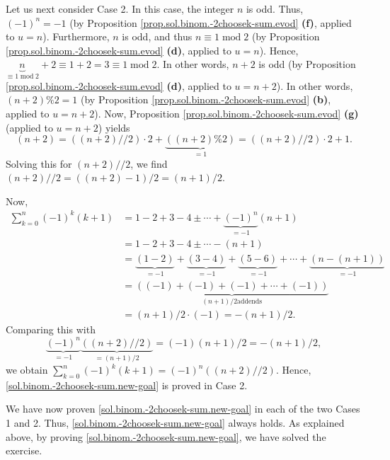 \documentclass[paper=a4, fontsize=12pt]{scrartcl}%
\let\sumnonlimits\sum
\renewcommand{\sum}{\sumnonlimits\limits}
\theoremstyle{plainsl}
\theoremstyle{definition}
\theoremstyle{remark}
\begin{document}
Let us next consider Case 2. In this case, the integer $n$ is odd. Thus,
$\left(  -1\right)  ^{n}=-1$ (by Proposition
\ref{prop.sol.binom.-2choosek-sum.evod} \textbf{(f)}, applied to $u=n$).
Furthermore, $n$ is odd, and thus $n\equiv1\operatorname{mod}2$ (by
Proposition \ref{prop.sol.binom.-2choosek-sum.evod} \textbf{(d)}, applied to
$u=n$). Hence, $\underbrace{n}_{\equiv1\operatorname{mod}2}+2\equiv
1+2=3\equiv1\operatorname{mod}2$. In other words, $n+2$ is odd (by Proposition
\ref{prop.sol.binom.-2choosek-sum.evod} \textbf{(d)}, applied to $u=n+2$). In
other words, $\left(  n+2\right)  \%2=1$ (by Proposition
\ref{prop.sol.binom.-2choosek-sum.evod} \textbf{(b)}, applied to $u=n+2$).
Now, Proposition \ref{prop.sol.binom.-2choosek-sum.evod} \textbf{(g)} (applied
to $u=n+2$) yields
\[
\left(  n+2\right)  =\left(  \left(  n+2\right)  //2\right)  \cdot
2+\underbrace{\left(  \left(  n+2\right)  \%2\right)  }_{=1}=\left(  \left(
n+2\right)  //2\right)  \cdot2+1.
\]
Solving this for $\left(  n+2\right)  //2$, we find $\left(  n+2\right)
//2=\left(  \left(  n+2\right)  -1\right)  /2=\left(  n+1\right)  /2$.

Now,%
\begin{align*}
\sum_{k=0}^{n}\left(  -1\right)  ^{k}\left(  k+1\right)   &  =1-2+3-4\pm
\cdots+\underbrace{\left(  -1\right)  ^{n}}_{=-1}\left(  n+1\right) \\
&  =1-2+3-4\pm\cdots-\left(  n+1\right) \\
&  =\underbrace{\left(  1-2\right)  }_{=-1}+\underbrace{\left(  3-4\right)
}_{=-1}+\underbrace{\left(  5-6\right)  }_{=-1}+\cdots+\underbrace{\left(
n-\left(  n+1\right)  \right)  }_{=-1}\\
&  =\underbrace{\left(  \left(  -1\right)  +\left(  -1\right)  +\left(
-1\right)  +\cdots+\left(  -1\right)  \right)  }_{\left(  n+1\right)  /2\text{
addends}}\\
&  =\left(  n+1\right)  /2\cdot\left(  -1\right)  =-\left(  n+1\right)  /2.
\end{align*}
Comparing this with%
\[
\underbrace{\left(  -1\right)  ^{n}}_{=-1}\underbrace{\left(  \left(
n+2\right)  //2\right)  }_{=\left(  n+1\right)  /2}=\left(  -1\right)  \left(
n+1\right)  /2=-\left(  n+1\right)  /2,
\]
we obtain $\sum_{k=0}^{n}\left(  -1\right)  ^{k}\left(  k+1\right)  =
\left(-1\right)^n \left(\left( n+2\right)  //2\right)$.
Hence, \eqref{sol.binom.-2choosek-sum.new-goal} is proved in
Case 2.

We have now proven \eqref{sol.binom.-2choosek-sum.new-goal} in each of the two
Cases 1 and 2. Thus, \eqref{sol.binom.-2choosek-sum.new-goal} always holds. As
explained above, by proving \eqref{sol.binom.-2choosek-sum.new-goal}, we have
solved the exercise.
\end{document}
